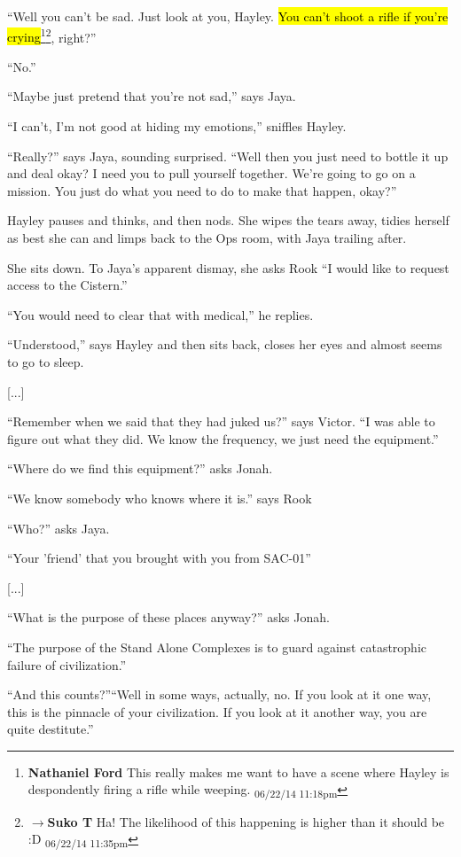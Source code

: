 ``Well you can't be sad.  Just look at you, Hayley.  \hl{You can't shoot a rifle if you're crying}\footnote{\textbf{Nathaniel Ford }This really makes me want to have a scene where Hayley is despondently firing a rifle while weeping. \textsubscript{06/22/14 11:18pm}}\footnote{$\rightarrow$\textbf{Suko T }Ha!  The likelihood of this happening is higher than it should be :D \textsubscript{06/22/14 11:35pm}}, right?''

``No.''

``Maybe just pretend that you're not sad,'' says Jaya.

``I can't, I'm not good at hiding my emotions,'' sniffles Hayley.

``Really?'' says Jaya, sounding surprised.  ``Well then you just need to bottle it up and deal okay?  I need you to pull yourself together.  We're going to go on a mission.  You just do what you need to do to make that happen, okay?''

Hayley pauses and thinks, and then nods.  She wipes the tears away, tidies herself as best she can and limps back to the Ops room, with Jaya trailing after.



She sits down.  To Jaya's apparent dismay, she asks Rook ``I would like to request access to the Cistern.''

``You would need to clear that with medical,'' he replies.

``Understood,'' says Hayley and then sits back, closes her eyes and almost seems to go to sleep.

{[}...{]}

``Remember when we said that they had juked us?'' says Victor.  ``I was able to figure out what they did.  We know the frequency, we just need the equipment.''

``Where do we find this equipment?'' asks Jonah.

``We know somebody who knows where it is.'' says Rook

``Who?'' asks Jaya.

``Your 'friend' that you brought with you from SAC-01'' 

{[}...{]}

``What is the purpose of these places anyway?'' asks Jonah.

``The purpose of the Stand Alone Complexes is to guard against catastrophic failure of civilization.''

``And this counts?''``Well in some ways, actually, no.  If you look at it one way, this is the pinnacle of your civilization. If you look at it another way, you are quite destitute.''

